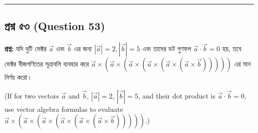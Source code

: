 \documentclass[12pt]{article}
\begin{document}
\vspace{0.8cm}

\noindent\rule{\textwidth}{1pt}
\subsection*{প্রশ্ন ৫৩ (Question 53)}

\textbf{প্রশ্ন:} যদি দুটি ভেক্টর $\vec{a}$ এবং $\vec{b}$ এর জন্য $|\vec{a}| = 2, |\vec{b}| = 5$ এবং তাদের ডট গুণফল $\vec{a} \cdot \vec{b} = 0$ হয়, তবে ভেক্টর বীজগণিতের সূত্রাবলি ব্যবহার করে $\vec{a} \times (\vec{a} \times (\vec{a} \times (\vec{a} \times (\vec{a} \times (\vec{a} \times \vec{b})))))$ এর মান নির্ণয় করো।

(If for two vectors $\vec{a}$ and $\vec{b}$, $|\vec{a}| = 2$, $|\vec{b}| = 5$, and their dot product is $\vec{a} \cdot \vec{b} = 0$, use vector algebra formulas to evaluate $\vec{a} \times (\vec{a} \times (\vec{a} \times (\vec{a} \times (\vec{a} \times (\vec{a} \times \vec{b})))))$.)

\begin{center}
\end{center}
\end{document}
